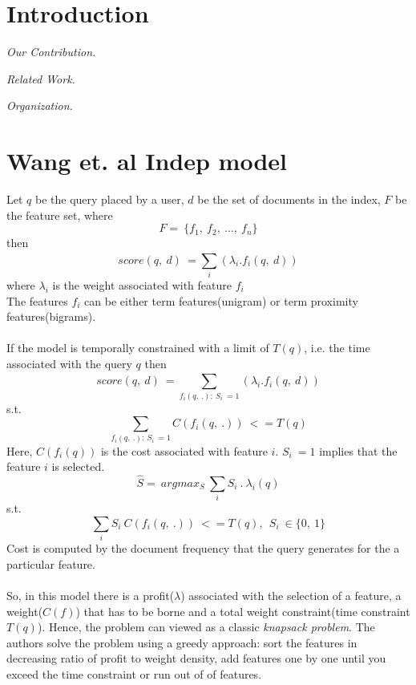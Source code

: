 \documentclass[10pt, conference, compsocconf]{IEEEtran}
\begin{document}
\begin{IEEEkeywords}
\end{IEEEkeywords}


\IEEEpeerreviewmaketitle


\section{Introduction}

\vspace*{0.1cm}
\noindent \emph{Our Contribution.}
 

\vspace*{0.1cm}
\noindent \emph{Related Work.}
\cite{wang:CIKM10}

\vspace*{0.1cm}
\noindent \emph{Organization.}



\section{Wang et. al Indep model}
Let $q$ be the query placed by a user, $d$ be the set of documents in the index, $F$ be the feature set, where
$$F=\ \{f_1,\ f_2,\ \dots,\ f_n\}$$
then \\
$$score(q,\ d)\ = \sum_{i}^{}(\lambda_i .f_i(q,\ d))$$
where $\lambda_i$ is the weight associated with feature $f_i$\\
The features $f_i$ can be either term features(unigram) or term proximity features(bigrams).\\\\
If the model is temporally constrained with a limit of $T(q)$, i.e. the time associated with the query $q$ then \\
$$score(q,\ d)\ = \sum_{f_i(q,\ .):\ S_i\ =1}^{}(\lambda_i .f_i(q,\ d))$$
s.t. \\
$$\sum_{f_i(q,\ .):\ S_i\ =1}C(f_i(q,\ .))\ <= T(q)$$
Here, $C(f_i(q))$ is the cost associated with feature $i$. $S_i\ =1$ implies that the feature $i$ is selected.\\
$$\hat{S}=\ argmax_S\ \sum_{i}S_i\ .\ \lambda_i(q)$$
s.t.\\
$$\sum_{i}S_i\ C(f_i(q,\ .))\ <=T(q),\ \ S_i\ \in\{0,\ 1\}$$
Cost is computed by the document frequency that the query generates for the a particular feature.\\\\
So, in this model there is a profit($\lambda$) associated with the selection of a feature, a weight($C(f)$) that has to be borne and a total weight constraint(time constraint $T(q)$). Hence, the problem can viewed as a classic \textit{knapsack problem}.
The authors solve the problem using a greedy approach: sort the features in decreasing ratio of profit to weight density, add features one by one until you exceed the time constraint or run out of of features.
\end{document}
